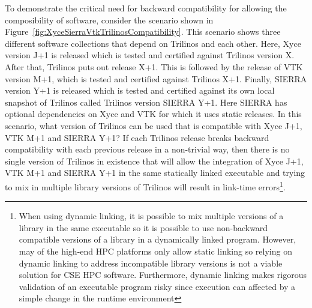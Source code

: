 \documentclass[11pt]{SANDreport}
\begin{document}
To demonstrate the critical need for backward compatibility for
allowing the composibility of software, consider the scenario shown in
Figure~\ref{fig:XyceSierraVtkTrilinosCompatibility}.  This scenario
shows three different software collections that depend on Trilinos and each other.  Here, Xyce version J+1 is released which is
tested and certified against Trilinos version X.  After that, Trilinos
puts out release X+1.  This is followed by the release of VTK version
M+1, which is tested and certified against Trilinos X+1.  Finally,
SIERRA version Y+1 is released which is tested and certified against
its own local snapshot of Trilinos called Trilinos version SIERRA Y+1.
Here SIERRA has optional dependencies on Xyce and VTK for which it uses
static releases.  In this scenario, what version of Trilinos can be
used that is compatible with Xyce J+1, VTK M+1 and SIERRA Y+1?  If
each Trilinos release breaks backward compatibility with each previous
release in a non-trivial way, then there is no single version of
Trilinos in existence that will allow the integration of Xyce J+1, VTK
M+1 and SIERRA Y+1 in the same statically linked executable and
trying to mix in multiple library versions of Trilinos will result in
link-time errors\footnote{When using dynamic linking, it is possible
to mix multiple versions of a library in the same executable so it is
possible to use non-backward compatible versions of a library in a
dynamically linked program.  However, may of the high-end HPC
platforms only allow static linking so relying on dynamic linking to
address incompatible library versions is not a viable solution for CSE
HPC software.  Furthermore, dynamic linking makes rigorous validation of an executable program risky since execution can affected by a simple change in the runtime environment}.
\end{document}
